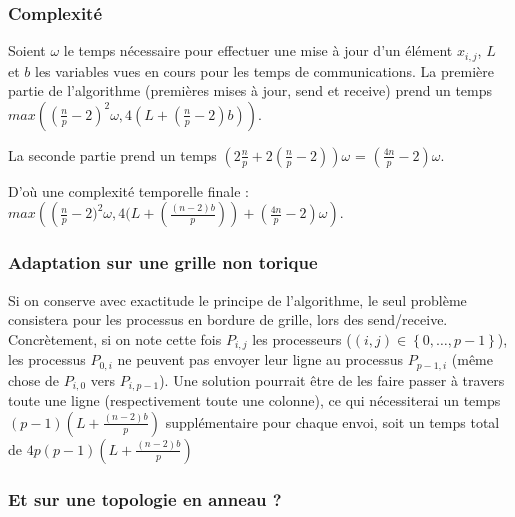 \documentclass{article}
\begin{document}
\subsubsection*{Complexité}

Soient $\omega$ le temps nécessaire pour effectuer une mise à jour d'un élément $x_{i,j}$, $L$ et $b$ les variables vues en cours pour les temps de communications. %
La première partie de l'algorithme (premières mises à jour, send et receive) prend un temps $max \left( (\frac{n}{p}-2)^2\omega, 4(L + (\frac{n}{p}-2)b) \right) $.

La seconde partie prend un temps $(2\frac{n}{p} + 2(\frac{n}{p}-2))\omega$ = $(\frac{4n}{p}-2)\omega$.

D'où une complexité temporelle finale : $max \left( \left(\frac{n}{p}-2)^2\omega, 4(L + (\frac{(n-2)b}{p}) \right) + \left(\frac{4n}{p}-2 \right)\omega \right)$.

\subsubsection*{Adaptation sur une grille non torique}

Si on conserve avec exactitude le principe de l'algorithme, le seul problème consistera pour les processus en bordure de grille, lors des send/receive.
Concrètement, si on note cette fois $P_{i,j}$ les processeurs ($(i,j) \in \left\{ 0, \dots,p-1\right\}$), les processus $P_{0,i}$ ne peuvent pas envoyer leur ligne au processus $P_{p-1,i}$ (même chose de $P_{i,0}$ vers $P_{i,p-1}$).
Une solution pourrait être de les faire passer à travers toute une ligne (respectivement toute une colonne), ce qui nécessiterai un temps $(p-1)(L + \frac{(n-2)b}{p})$ supplémentaire pour chaque envoi, soit un temps total de $4p(p-1)(L + \frac{(n-2)b}{p})$

\subsubsection*{Et sur une topologie en anneau ?}
\end{document}
